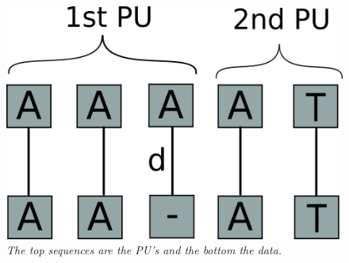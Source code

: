 \documentclass[12pt]{article}
\newcommand{\pus}{PU's }
\begin{document}
\begin{figure}[H]
\begin{center}
\includegraphics[scale=0.3]{Diagrams/scnfail.png}
\end{center}
\caption{\textit{The top sequences are the \pus and the bottom the data.}}
\end{figure}
\end{document}
